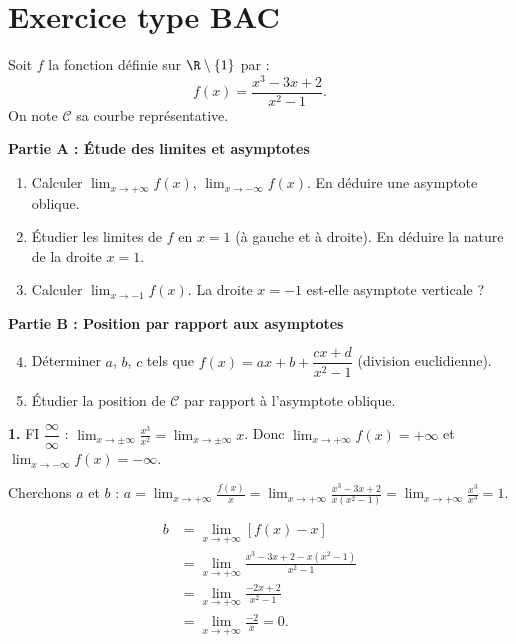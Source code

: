 \section{Exercice type BAC}

\exercice{\etoilepleine\etoilepleine\etoilepleine}

Soit $f$ la fonction définie sur $\R\setminus\{1\}$ par :
\[
f(x) = \frac{x^3 - 3x + 2}{x^2 - 1}.
\]
On note $\mathcal{C}$ sa courbe représentative.

\medskip
\textbf{Partie A : Étude des limites et asymptotes}
\begin{enumerate}
	\item Calculer $\displaystyle\lim_{x\to+\infty}f(x)$,
	$\displaystyle\lim_{x\to-\infty}f(x)$.
	En déduire une asymptote oblique.
	\item Étudier les limites de $f$ en $x=1$ (à gauche et à droite).
	En déduire la nature de la droite $x=1$.
	\item Calculer $\displaystyle\lim_{x\to -1}f(x)$.
	La droite $x=-1$ est-elle asymptote verticale ?
\end{enumerate}

\textbf{Partie B : Position par rapport aux asymptotes}
\begin{enumerate}
	\setcounter{enumi}{3}
	\item Déterminer $a$, $b$, $c$ tels que
	$f(x)=ax+b+\dfrac{cx+d}{x^2-1}$ (division euclidienne).
	\item Étudier la position de $\mathcal{C}$ par rapport à l'asymptote oblique.
\end{enumerate}

\solution

\textbf{1.} FI $\dfrac{\infty}{\infty}$ :
$\displaystyle\lim_{x\to\pm\infty}\frac{x^3}{x^2}=\lim_{x\to\pm\infty}x$.
Donc $\displaystyle\lim_{x\to+\infty}f(x)=+\infty$ et
$\displaystyle\lim_{x\to-\infty}f(x)=-\infty$.

Cherchons $a$ et $b$ :
$a=\displaystyle\lim_{x\to+\infty}\frac{f(x)}{x}
=\lim_{x\to+\infty}\frac{x^3-3x+2}{x(x^2-1)}
=\lim_{x\to+\infty}\frac{x^3}{x^3}=1$.

\[
\begin{aligned}
	b &= \lim_{x\to+\infty}[f(x)-x] \\
	&= \lim_{x\to+\infty}\frac{x^3-3x+2-x(x^2-1)}{x^2-1} \\
	&= \lim_{x\to+\infty}\frac{-2x+2}{x^2-1} \\
	&= \lim_{x\to+\infty}\frac{-2}{x}=0.
\end{aligned}
\]

